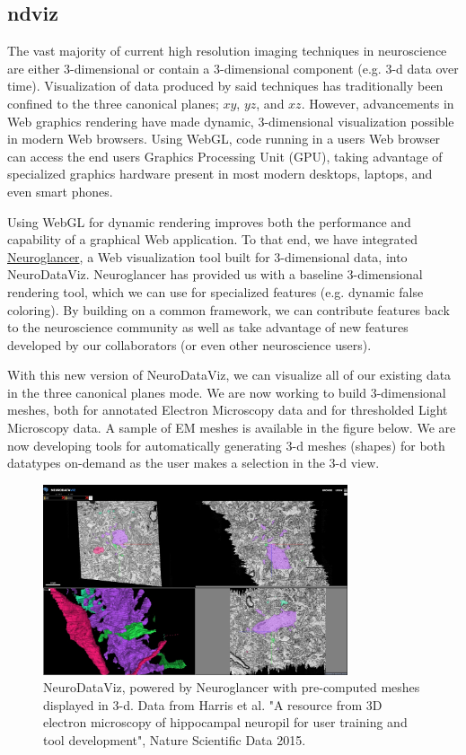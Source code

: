 \documentclass[simplex.tex]{subfiles}
\begin{document}
\subsection{ndviz}

The vast majority of current high resolution imaging techniques in neuroscience are either 3-dimensional or contain a 3-dimensional component (e.g. 3-d data over time). Visualization of data produced by said techniques has traditionally been confined to the three canonical planes; $xy$, $yz$, and $xz$. However, advancements in Web graphics rendering have made dynamic, 3-dimensional visualization possible in modern Web browsers. Using WebGL, code running in a users Web browser can access the end users Graphics Processing Unit (GPU), taking advantage of specialized graphics hardware present in most modern desktops, laptops, and even smart phones. 

Using WebGL for dynamic rendering improves both the performance and capability of a graphical Web application. To that end, we have integrated \href{https://github.com/google/neuroglancer}{Neuroglancer}, a Web visualization tool built for 3-dimensional data, into NeuroDataViz. Neuroglancer has provided us with a baseline 3-dimensional rendering tool, which we can use for specialized features (e.g. dynamic false coloring). By building on a common framework, we can contribute features back to the neuroscience community as well as take advantage of new features developed by our collaborators (or even other neuroscience users). 

With this new version of NeuroDataViz, we can visualize all of our existing data in the three canonical planes mode. We are now working to build 3-dimensional meshes, both for annotated Electron Microscopy data and for thresholded Light Microscopy data. A sample of EM meshes is available in the figure below. We are now developing tools for automatically generating 3-d meshes (shapes) for both datatypes on-demand as the user makes a selection in the 3-d view.  


\begin{figure}[!h]
\begin{cframed}
\centering
\includegraphics[width=0.8\textwidth]{../../figs/ndviz3d_fig.jpg}
\caption{NeuroDataViz, powered by Neuroglancer with pre-computed meshes displayed in 3-d. Data from Harris et al. "A resource from 3D electron microscopy of hippocampal neuropil for user training and tool development", Nature Scientific Data 2015.}
\label{fig:name}
\end{cframed}
\end{figure}
\end{document}
